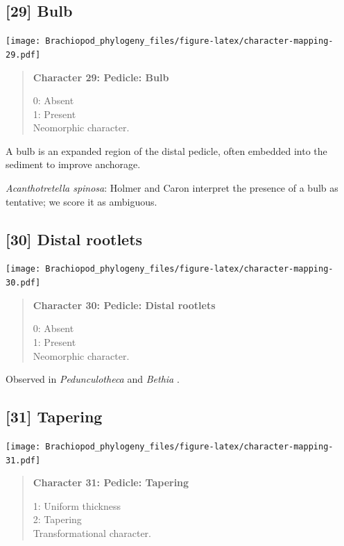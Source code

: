 \documentclass[openany]{book}
\begin{document}
\subsection*{{[}29{]} Bulb}\label{bulb}

\texttt{[image: Brachiopod\_phylogeny\_files/figure-latex/character-mapping-29.pdf]}

\begin{quote}
\textbf{Character 29: Pedicle: Bulb}

0: Absent\\
1: Present\\
Neomorphic character.
\end{quote}

A bulb is an expanded region of the distal pedicle, often embedded into
the sediment to improve anchorage.

\hypertarget{Acanthotretella_spinosa-coding-29}{}
\emph{Acanthotretella spinosa}: Holmer and Caron
\citeyearpar{Holmer2006Aspinose} interpret the presence of a bulb as
tentative; we score it as ambiguous.

\subsection*{{[}30{]} Distal rootlets}\label{distal-rootlets}

\texttt{[image: Brachiopod\_phylogeny\_files/figure-latex/character-mapping-30.pdf]}

\begin{quote}
\textbf{Character 30: Pedicle: Distal rootlets}

0: Absent\\
1: Present\\
Neomorphic character.
\end{quote}

Observed in \emph{Pedunculotheca} and \emph{Bethia}
\citep{Sutton2005Silurianbrachiopods}.

\subsection*{{[}31{]} Tapering}\label{tapering}

\texttt{[image: Brachiopod\_phylogeny\_files/figure-latex/character-mapping-31.pdf]}

\begin{quote}
\textbf{Character 31: Pedicle: Tapering}

1: Uniform thickness\\
2: Tapering\\
Transformational character.
\end{quote}
\end{document}
